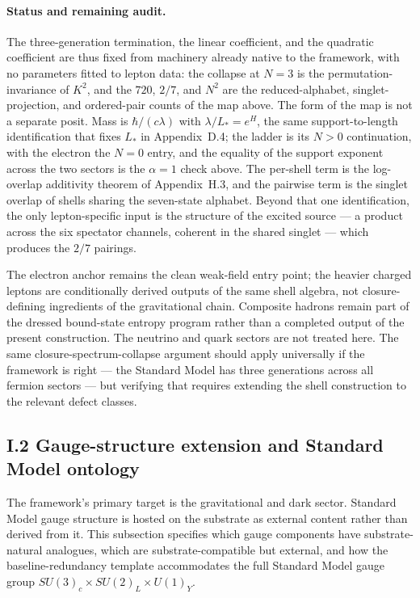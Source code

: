 \documentclass[11pt]{article}
\begin{document}
\paragraph{Status and remaining audit.}
The three-generation termination, the linear coefficient, and the quadratic coefficient are thus fixed from machinery already native to the framework, with no parameters fitted to lepton data: the collapse at $N=3$ is the permutation-invariance of $K^2$, and the $720$, $2/7$, and $N^2$ are the reduced-alphabet, singlet-projection, and ordered-pair counts of the map above. The form of the map is not a separate posit. Mass is $\hbar/(c\lambda)$ with $\lambda/L_*=e^{H}$, the same support-to-length identification that fixes $L_*$ in Appendix~D.4; the ladder is its $N>0$ continuation, with the electron the $N=0$ entry, and the equality of the support exponent across the two sectors is the $\alpha=1$ check above. The per-shell term is the log-overlap additivity theorem of Appendix~H.3, and the pairwise term is the singlet overlap of shells sharing the seven-state alphabet. Beyond that one identification, the only lepton-specific input is the structure of the excited source --- a product across the six spectator channels, coherent in the shared singlet --- which produces the $2/7$ pairings.

The electron anchor remains the clean weak-field entry point; the heavier charged leptons are conditionally derived outputs of the same shell algebra, not closure-defining ingredients of the gravitational chain. Composite hadrons remain part of the dressed bound-state entropy program rather than a completed output of the present construction. The neutrino and quark sectors are not treated here. The same closure-spectrum-collapse argument should apply universally if the framework is right --- the Standard Model has three generations across all fermion sectors --- but verifying that requires extending the shell construction to the relevant defect classes.

\subsection*{I.2 Gauge-structure extension and Standard Model ontology}

The framework's primary target is the gravitational and dark sector. Standard Model gauge structure is hosted on the substrate as external content rather than derived from it. This subsection specifies which gauge components have substrate-natural analogues, which are substrate-compatible but external, and how the baseline-redundancy template accommodates the full Standard Model gauge group $SU(3)_c\times SU(2)_L\times U(1)_Y$.
\end{document}

